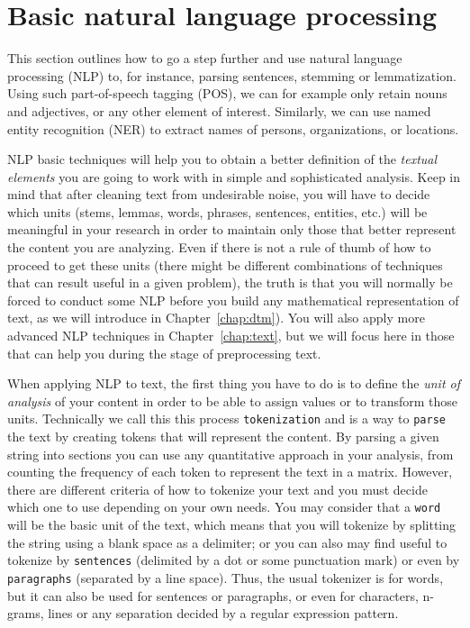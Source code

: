 \section{Basic natural language processing}



This section outlines how to go a step further and use natural language processing (NLP) to, for instance, parsing sentences, stemming or lemmatization. Using such part-of-speech tagging (POS), we can for example only retain nouns and adjectives, or any other element of interest. Similarly, we can use named entity recognition (NER) to extract names of persons, organizations, or locations.

NLP basic techniques will help you to obtain a better definition of the \textit{textual elements} you are going to work with in simple and sophisticated analysis. Keep in mind that after cleaning text from undesirable noise, you will have to decide which units (stems, lemmas, words, phrases, sentences, entities, etc.) will be meaningful in your research in order to maintain only those that better represent the content you are analyzing. Even if there is not a rule of thumb of how to proceed to get these units (there might be different combinations of techniques that can result useful in a given problem), the truth is that you will normally be forced to conduct some NLP before you build any mathematical representation of text, as we will introduce in Chapter~\ref{chap:dtm}). You will also apply more advanced NLP techniques in Chapter~\ref{chap:text}, but we will focus here in those that can help you during the stage of preprocessing text.

When applying NLP to text, the first thing you have to do is to define the \textit{unit of analysis} of your content in order to be able to assign values or to transform those units. Technically we call this this process \texttt{tokenization} and is a way to \texttt{parse} the text by creating tokens that will represent the content. By parsing a given string into sections you can use any quantitative approach in your analysis, from counting the frequency of each token to represent the text in a matrix. However, there are different criteria of how to tokenize your text and you must decide which one to use depending on your own needs. You may consider that a \texttt{word} will be the basic unit of the text, which means that you will tokenize by splitting the string using a blank space as a delimiter; or you can also may find useful to tokenize by \texttt{sentences} (delimited by a dot or some punctuation mark) or even by \texttt{paragraphs} (separated by a line space). Thus, the usual tokenizer is for words, but it can also be used for sentences or paragraphs, or even for characters, n-grams, lines or any separation decided by a regular expression pattern.

